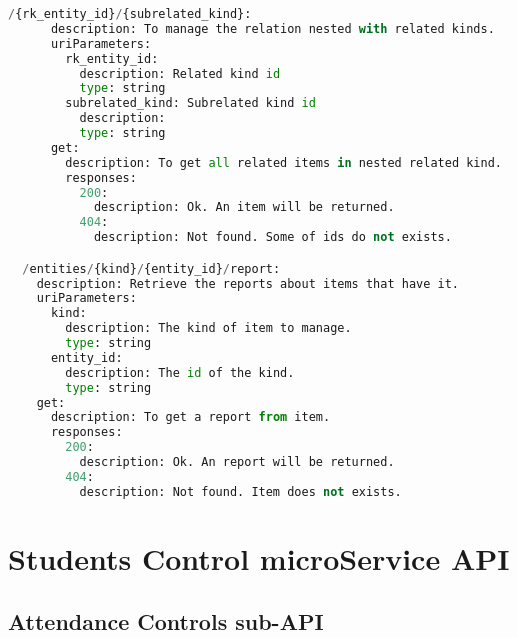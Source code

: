 \begin{lstlisting}[language=python,frame=none]
    /{rk_entity_id}/{subrelated_kind}:
      description: To manage the relation nested with related kinds.
      uriParameters:
        rk_entity_id:
          description: Related kind id
          type: string
        subrelated_kind: Subrelated kind id
          description:
          type: string
      get:
        description: To get all related items in nested related kind.
        responses:
          200:
            description: Ok. An item will be returned.
          404:
            description: Not found. Some of ids do not exists.

  /entities/{kind}/{entity_id}/report:
    description: Retrieve the reports about items that have it.
    uriParameters:
      kind:
        description: The kind of item to manage.
        type: string
      entity_id:
        description: The id of the kind.
        type: string
    get:
      description: To get a report from item.
      responses:
        200:
          description: Ok. An report will be returned.
        404:
          description: Not found. Item does not exists.
\end{lstlisting}

\section{Students Control microService API}

\subsection{Attendance Controls sub-API}

